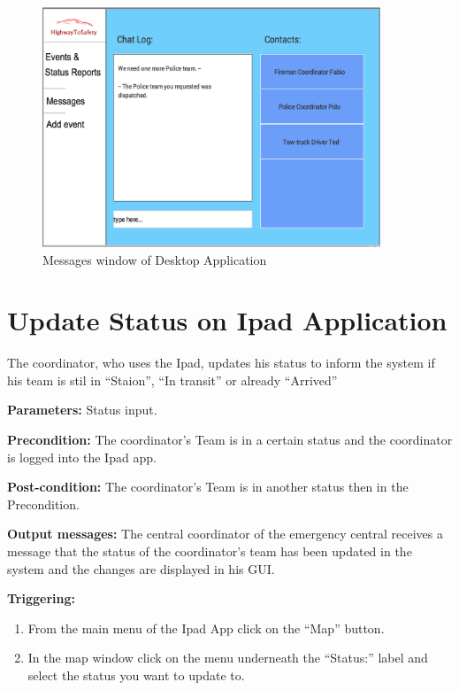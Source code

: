 \begin{minipage}{1.0\textwidth}
\begin{figure}[H]
\caption{Messages window of Desktop Application}
\includegraphics[width=0.9\textwidth]{Desktop_chat.eps}
\end{figure}
\end{minipage}

\section{Update Status on Ipad Application}
\label{operation:MyOperation}
The coordinator, who uses the Ipad, updates his status to inform the system if
his team is stil in “Staion”, “In transit” or already “Arrived”

\begin{description}

\item \textbf{Parameters:} Status input.
\item \textbf{Precondition:} The coordinator's Team is in a certain status and
the coordinator is logged into the Ipad app.
\item \textbf{Post-condition:} The coordinator's Team is in another status then
in the Precondition.
\item \textbf{Output messages:} The central coordinator of the emergency central
receives a message that the status of the coordinator's team has been updated in
the system and the changes are displayed in his GUI.

\item \textbf{Triggering:} 
\begin{enumerate}
  \item From the main menu of the Ipad App click on the “Map” button.
  \item In the map window click on the menu underneath the “Status:” label and
  select the status you want to update to.
\end{enumerate}
\end{description}

